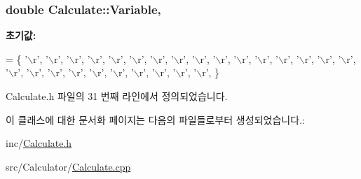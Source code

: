 \hypertarget{class_calculate_a75fc03f230ef600e36be8073acc34216}{
\subsubsection[{Variable}]{\setlength{\rightskip}{0pt plus 5cm}double Calculate\+::\+Variable\hspace{0.3cm}{\ttfamily [static]}, {\ttfamily [protected]}}}\label{class_calculate_a75fc03f230ef600e36be8073acc34216}
{\bfseries 초기값\+:}
\begin{DoxyCode}
= \{ \textcolor{charliteral}{'\(\backslash\)r'}, \textcolor{charliteral}{'\(\backslash\)r'}, \textcolor{charliteral}{'\(\backslash\)r'}, \textcolor{charliteral}{'\(\backslash\)r'}, \textcolor{charliteral}{'\(\backslash\)r'}, \textcolor{charliteral}{'\(\backslash\)r'}, \textcolor{charliteral}{'\(\backslash\)r'},
        \textcolor{charliteral}{'\(\backslash\)r'}, \textcolor{charliteral}{'\(\backslash\)r'}, \textcolor{charliteral}{'\(\backslash\)r'}, \textcolor{charliteral}{'\(\backslash\)r'}, \textcolor{charliteral}{'\(\backslash\)r'}, \textcolor{charliteral}{'\(\backslash\)r'}, \textcolor{charliteral}{'\(\backslash\)r'}, \textcolor{charliteral}{'\(\backslash\)r'}, \textcolor{charliteral}{'\(\backslash\)r'}, \textcolor{charliteral}{'\(\backslash\)r'}, \textcolor{charliteral}{'\(\backslash\)r'}, \textcolor{charliteral}{'\(\backslash\)r'},
        \textcolor{charliteral}{'\(\backslash\)r'}, \textcolor{charliteral}{'\(\backslash\)r'}, \textcolor{charliteral}{'\(\backslash\)r'}, \textcolor{charliteral}{'\(\backslash\)r'}, \textcolor{charliteral}{'\(\backslash\)r'}, \textcolor{charliteral}{'\(\backslash\)r'}, \textcolor{charliteral}{'\(\backslash\)r'}, \}
\end{DoxyCode}


Calculate.\+h 파일의 31 번째 라인에서 정의되었습니다.



이 클래스에 대한 문서화 페이지는 다음의 파일들로부터 생성되었습니다.\+:\begin{DoxyCompactItemize}
\item 
inc/\hyperlink{_calculate_8h}{Calculate.\+h}\item 
src/\+Calculator/\hyperlink{_calculate_8cpp}{Calculate.\+cpp}\end{DoxyCompactItemize}

